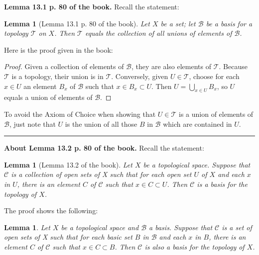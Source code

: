 \documentclass[12pt,letterpaper]{article}
\newtheorem{lem}[thm]{Lemma}
\newcommand{\B}{\mathcal B}
\newcommand{\hs}{\bigskip\hrule\medskip}
\newcommand{\mc}{\mathcal}
\newcommand{\noi}{\noindent}%
\begin{document}
\noi\textbf{Lemma 13.1 p. 80 of the book.} Recall the statement: 

\begin{lem}[Lemma 13.1 p. 80 of the book]\label{L13.1}
Let $X$ be a set; let $\mathcal{B}$ be a basis for a topology $\mathcal{T}$ on $X$. Then $\mathcal{T}$ equals the collection of all unions of elements of $\mathcal{B}$.
\end{lem}

Here is the proof given in the book: 

\begin{proof}
Given a collection of elements of $\mathcal{B}$, they are also elements of $\mathcal{T}$. Because $\mathcal{T}$ is a topology, their union is in $\mathcal{T}$. Conversely, given $U \in \mathcal{T}$, choose for each $x\in U$ an element $B_x$ of $\mathcal{B}$ such that $x\in B_x \subset U$. Then $U=\bigcup_{x\in U}B_x$, so $U$ equals a union of elements of $\mathcal{B}$.
\end{proof} 

To avoid the Axiom of Choice when showing that $U \in \mathcal{T}$ is a union of elements of $\mathcal{B}$, just note that $U$ is the union of all those $B$ in $\mc B$ which are contained in  $U$. 


\hs

\noi\textbf{About Lemma 13.2 p. 80 of the book.} Recall the statement: 

\begin{lem}[Lemma 13.2 of the book]%
Let $X$ be a topological space. Suppose that $\mc C$ is a collection of open sets of X such that for each open set $U$ of $X$ and each $x$ in $U$, there is an element $C$ of $\mc C$ such that $x\in C\subset U$. Then $\mc C$ is a basis for the topology of $X$. 
\end{lem} 

The proof shows the following: 

\begin{lem}\label{L13.2b}
Let $X$ be a topological space and $\B$ a basis. Suppose that $\mc C$ is a set of open sets of X such that for each basic set $B$ in $\B$ and each $x$ in $B$, there is an element $C$ of $\mc C$ such that $x\in C\subset B$. Then $\mc C$ is also a basis for the topology of $X$. 
\end{lem} 
\end{document}
